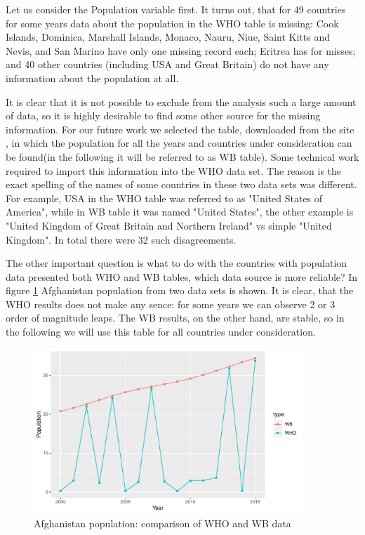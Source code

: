Let us consider the Population variable first. It turns out, that for 49 countries for some years data about the population in the WHO table is missing: Cook Islands, Dominica, Marshall Islands, Monaco, Nauru, Niue, Saint Kitts and Nevis, and San Marino have only one missing record each; Eritrea has for misses; and 40 other countries (including USA and Great Britain) do not have any information about the population at all.

It is clear that it is not possible to exclude from the analysis such a large amount of data, so it is highly desirable to find some other source for the missing information. For our future work we selected the table, downloaded from the site \cite{WB}, in which the population for all the years and countries under consideration can be found(in the following it will be referred to as WB table). Some technical work required to import this information into the WHO data set. The reason is the exact spelling of the names of some countries in these two data sets was different. For example, USA in the WHO table was referred to as "United States of America", while in WB table it was named "United States", the other example is "United Kingdom of Great Britain and Northern Ireland" vs simple "United Kingdom".  In total there were 32 such disagreements.

The other important question is what to do with the countries with population data presented both WHO and WB tables, which data source is more reliable? In figure \ref{fig:afghanistan_pop_comparison} Afghanistan population from two data sets is shown. It is clear, that the WHO results does not make any sence: for some years we can observe 2 or 3 order of magnitude leaps. The WB results, on the other hand, are stable, so in the following we will use this table for all countries under consideration.


\begin{figure}
  \centering
  \includegraphics[width = 0.9\textwidth]{figures/Afghanistan_population_comparison}
  \caption{Afghanistan population: comparison of WHO and WB data}
  \label{fig:afghanistan_pop_comparison}
\end{figure}

